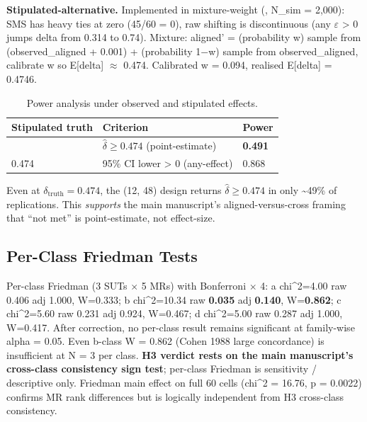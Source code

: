 \documentclass[manuscript,screen,review]{acmart}
\begin{document}
\textbf{Stipulated-alternative.} Implemented in
mixture-weight (,
N\_sim = 2,000): SMS has heavy ties at zero (45/60 = 0), raw shifting is
discontinuous (any $\varepsilon$ \textgreater{} 0 jumps delta from 0.314 to 0.74).
Mixture: aligned' = (probability w) sample from (observed\_aligned +
0.001) + (probability 1$-$w) sample from observed\_aligned, calibrate w so
E{[}delta{]} $\approx$ 0.474. Calibrated w = 0.094, realised E{[}delta{]} =
0.4746.

{%
\begin{longtable}[]{@{}lll@{}}
\caption{Power analysis under observed and stipulated effects.}\label{tab:p2-24}\\
\toprule\noalign{}
Stipulated truth & Criterion & Power \\
\midrule\noalign{}
\endfirsthead
\endhead
\bottomrule\noalign{}
\endlastfoot
0.474 & $\hat{\delta} \geq 0.474$ (point-estimate) & \textbf{0.491} \\
0.474 & 95\% CI lower \textgreater{} 0 (any-effect) & 0.868 \\
\end{longtable}
}

Even at $\delta_{\mathrm{truth}} = 0.474$, the (12, 48) design returns $\hat{\delta} \geq
0.474$ in only \textasciitilde49\% of replications. This
\emph{supports} the main manuscript's aligned-versus-cross framing that ``not met'' is point-estimate, not
effect-size.

\subsection{Per-Class Friedman Tests}\label{d.4-friedman-per-class-discussion-of-small-n-concordance}

Per-class Friedman (3 SUTs $\times$ 5 MRs) with Bonferroni $\times$ 4: a chi\^{}2=4.00
raw 0.406 adj 1.000, W=0.333; b chi\^{}2=10.34 raw \textbf{0.035} adj
\textbf{0.140}, W=\textbf{0.862}; c chi\^{}2=5.60 raw 0.231 adj 0.924,
W=0.467; d chi\^{}2=5.00 raw 0.287 adj 1.000, W=0.417. After correction,
no per-class result remains significant at family-wise alpha = 0.05.
Even b-class W = 0.862 (Cohen 1988 large concordance) is insufficient at
N = 3 per class. \textbf{H3 verdict rests on the main manuscript's cross-class consistency sign test}; per-class
Friedman is sensitivity / descriptive only. Friedman main effect on full
60 cells (chi\^{}2 = 16.76, p = 0.0022) confirms MR rank differences but
is logically independent from H3 cross-class consistency.
\end{document}
